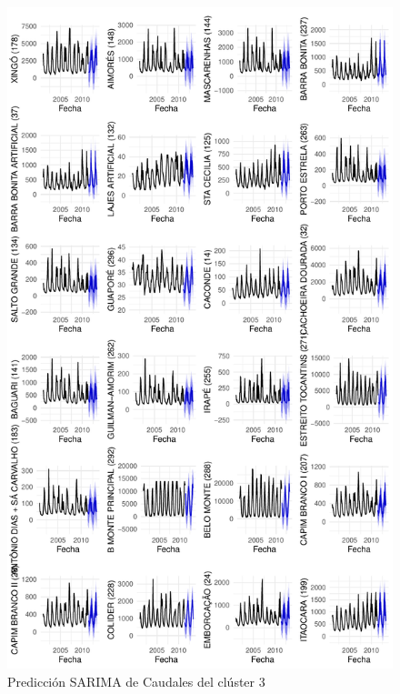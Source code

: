\documentclass[12pt,oneside]{book}\usepackage[]{graphicx}\usepackage[]{color}
\makeatletter
\def\maxwidth{ %
  \ifdim\Gin@nat@width>\linewidth
    \linewidth
  \else
    \Gin@nat@width
  \fi
}
\newenvironment{knitrout}{}{} %
\theoremstyle{definition} %
\makeatother
\begin{document}
\begin{knitrout}
\color{fgcolor}\begin{figure}[h]

{\centering \includegraphics[width=\maxwidth,height=0.85\textheight]{figure/unnamed-chunk-89-1} 

}

\caption{\label{fig:pred_cl3} Predicción SARIMA de Caudales del clúster 3}\label{fig:unnamed-chunk-89}
\end{figure}


\end{knitrout}
\end{document}
